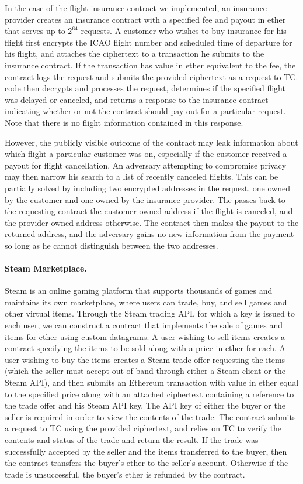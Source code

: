 In the case of the flight insurance contract we implemented, an insurance provider creates an insurance contract with a specified fee and payout in ether that serves up to $2^{64}$ requests.  A customer who wishes to buy insurance for his flight first encrypts the ICAO flight number and scheduled time of departure for his flight, and attaches the ciphertext to a transaction he submits to the insurance contract.  If the transaction has value in ether equivalent to the fee, the contract logs the request and submits the provided ciphertext as a request to TC.  \encname code then decrypts and processes the request, determines if the specified flight was delayed or canceled, and returns a response to the insurance contract indicating whether or not the contract should pay out for a particular request.  Note that there is no flight information contained in this response.

However, the publicly visible outcome of the contract may leak information about which flight a particular customer was on, especially if the customer received a payout for flight cancellation.  An adversary attempting to compromise privacy may then narrow his search to a list of recently canceled flights.  This can be partially solved by including two encrypted addresses in the request, one owned by the customer and one owned by the insurance provider.  The \encname passes back to the requesting contract the customer-owned address if the flight is canceled, and the provider-owned address otherwise.  The contract then makes the payout to the returned address, and the adversary gains no new information from the payment so long as he cannot distinguish between the two addresses.
\fi

\paragraph{Steam Marketplace.} Steam  is an online gaming platform that supports thousands of games and maintains its own marketplace, where users can trade, buy, and sell games and other virtual items.  Through the Steam trading API, for which a key is issued to each user, we can construct a contract that implements the sale of games and items for ether using custom datagrams.  A user wishing to sell items creates a contract specifying the items to be sold along with a price in ether for each.  A user wishing to buy the items creates a Steam trade offer requesting the items (which the seller must accept out of band through either a Steam client or the Steam API), and then submits an Ethereum transaction with value in ether equal to the specified price along with an attached ciphertext containing a reference to the trade offer and his Steam API key.  The API key of either the buyer or the seller is required in order to view the contents of the trade.  The contract submits a request to TC using the provided ciphertext, and relies on TC to verify the contents and status of the trade and return the result.  If the trade was successfully accepted by the seller and the items transferred to the buyer, then the contract transfers the buyer's ether to the seller's account.  Otherwise if the trade is unsuccessful, the buyer's ether is refunded by the contract.

